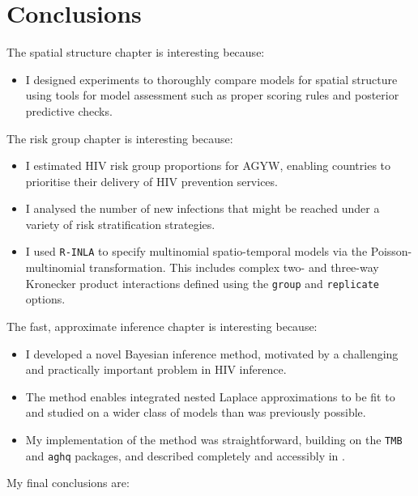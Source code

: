 \documentclass[a4paper, nobind]{templates/ociamthesis}
\providecommand{\tightlist}{%
  \setlength{\itemsep}{0pt}\setlength{\parskip}{0pt}}
\begin{document}
\hypertarget{conclusions}{%
\section{Conclusions}\label{conclusions}}

The spatial structure chapter is interesting because:

\begin{itemize}
\tightlist
\item
  I designed experiments to thoroughly compare models for spatial structure using tools for model assessment such as proper scoring rules and posterior predictive checks.
\end{itemize}

The risk group chapter is interesting because:

\begin{itemize}
\tightlist
\item
  I estimated HIV risk group proportions for AGYW, enabling countries to prioritise their delivery of HIV prevention services.
\item
  I analysed the number of new infections that might be reached under a variety of risk stratification strategies.
\item
  I used \texttt{R-INLA} to specify multinomial spatio-temporal models via the Poisson-multinomial transformation. This includes complex two- and three-way Kronecker product interactions defined using the \texttt{group} and \texttt{replicate} options.
\end{itemize}

The fast, approximate inference chapter is interesting because:

\begin{itemize}
\tightlist
\item
  I developed a novel Bayesian inference method, motivated by a challenging and practically important problem in HIV inference.
\item
  The method enables integrated nested Laplace approximations to be fit to and studied on a wider class of models than was previously possible.
\item
  My implementation of the method was straightforward, building on the \texttt{TMB} and \texttt{aghq} packages, and described completely and accessibly in \textcite{howes2023integrated}.
\end{itemize}

My final conclusions are:
\end{document}
